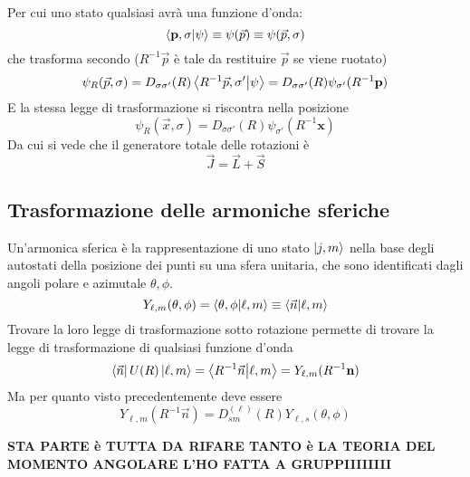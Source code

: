 \documentclass[twoside]{article}
\renewcommand{\vec}[1]{\textbf{#1}}
\begin{document}
Per cui uno stato qualsiasi avrà una funzione d'onda:
\begin{equation}
    \bra{\vec{p},\sigma}\ket{\psi}\equiv \psi(\Vec{p})\equiv\psi(\Vec{p},\sigma)
\end{equation}
che trasforma secondo ($R^{-1}\Vec{p}$ è tale da restituire $\Vec{p}$ se viene ruotato)
\begin{equation}
    \psi_R(\Vec{p},\sigma)=D_{\sigma \sigma'}(R)\bra{R^{-1}\Vec{p},\sigma'}\ket{\psi}=D_{\sigma \sigma'}(R)\psi_{\sigma'}(R^{-1}\vec{p})
\end{equation}
E la stessa legge di trasformazione si riscontra nella posizione
\begin{equation}
    \psi_R(\Vec{x},\sigma)=D_{\sigma \sigma'}(R)\psi_{\sigma'}(R^{-1}\vec{x})
\end{equation}
Da cui si vede che il generatore totale delle rotazioni è
\begin{equation}
    \Vec{J}=\Vec{L}+\Vec{S}
\end{equation}

\vspace{0.5cm}

\subsection{Trasformazione delle armoniche sferiche}
Un'armonica sferica è la rappresentazione di uno stato $\ket{j,m}$ nella base degli autostati della posizione dei punti su una sfera unitaria, che sono identificati dagli angoli polare e azimutale $\theta, \phi$.
\begin{equation}
    Y_{\ell,m}(\theta,\phi)=\bra{\theta,\phi}\ket{\ell, m}\equiv\bra{\Vec{n}}\ket{\ell,m}
\end{equation}
Trovare la loro legge di trasformazione sotto rotazione permette di trovare la legge di trasformazione di qualsiasi funzione d'onda
\begin{equation}
    \bra{\Vec{n}}U(R)\ket{\ell,m}=\bra{R^{-1}\Vec{n}}\ket{\ell,m}=Y_{\ell,m}(R^{-1}\vec{n})
\end{equation}
Ma per quanto visto precedentemente deve essere
\begin{equation}
    Y_{\ell,m}(R^{-1}\Vec{n})=D_{sm}^{(\ell)}(R)Y_{\ell,s}(\theta,\phi)
\end{equation}


\textbf{STA PARTE è TUTTA DA RIFARE TANTO è LA TEORIA DEL MOMENTO ANGOLARE L'HO FATTA A GRUPPIIIIIIII}



\newpage
\end{document}
